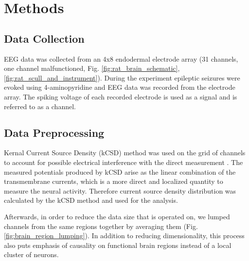 \documentclass[journal,12pt,onecolumn,draftclsnofoot]{IEEEtran}  %
\begin{document}
\section{Methods}
\subsection{Data Collection}
EEG data was collected from an 4x8 endodermal electrode array (31 channels, one channel malfunctioned, Fig. \ref{fig:rat_brain_schematic}, \ref{fig:rat_scull_and_instrument}). During the experiment epileptic seizures were evoked using 4-aminopyridine and EEG data was recorded from the electrode array. The spiking voltage of each recorded electrode is used as a signal and is referred to as a channel. 

\subsection{Data Preprocessing}
Kernal Current Source Density (kCSD) method was used on the grid of channels to account for possible electrical interference with the direct measurement \cite{Potworowski2012}. The measured potentials produced by kCSD arise as the linear combination of the transmembrane currents, which is a more direct and localized quantity to measure the neural activity. Therefore current source density distribution was calculated by the kCSD method and used for the analysis.

Afterwards, in order to reduce the data size that is operated on, we lumped channels from the same regions together by averaging them (Fig. \ref{fig:brain_region_lumping}). In addition to reducing dimensionality, this process also puts emphasis of causality on functional brain regions instead of a local cluster of neurons. 

  
\end{document}
